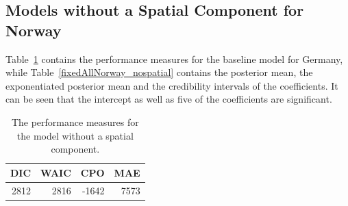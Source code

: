 \subsection{Models without a Spatial Component for Norway}\label{sec:nospatial_norway}
Table~\ref{allNorway_nospatial} contains the performance measures for the baseline model for Germany, while Table~\ref{fixedAllNorway_nospatial} contains the posterior mean, the exponentiated posterior mean and the credibility intervals of the coefficients. It can be seen that the intercept as well as five of the coefficients are significant.
\begin{table}[H] 
\caption{The performance measures for the model without a spatial component. \label{allNorway_nospatial}}
\begin{tabular}{r r r r}
\toprule\textbf{DIC}	& \textbf{WAIC} & \textbf{CPO} & \textbf{MAE}\\
\midrule
2812 & 2816 & -1642 & 7573 \\
\bottomrule
\end{tabular}
\end{table} 
